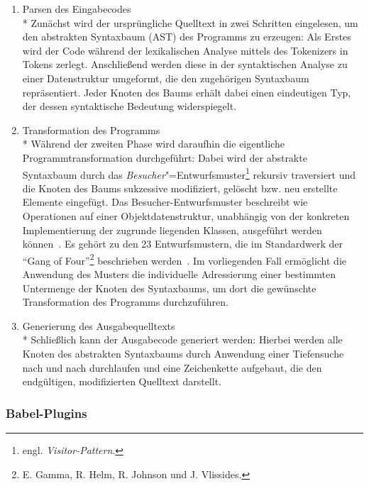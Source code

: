 \begin{enumerate}
  \item {\libertineSB Parsen des Eingabecodes}\\*
    Zunächst wird der ursprüngliche Quelltext in zwei Schritten eingelesen, um den abstrakten Syntaxbaum (AST) des Programms zu erzeugen: Als Erstes wird der Code während der lexikalischen Analyse mittels des Tokenizers in Tokens zerlegt. Anschließend werden diese in der syntaktischen Analyse zu einer Datenstruktur umgeformt, die den zugehörigen Syntaxbaum repräsentiert. Jeder Knoten des Baums erhält dabei einen eindeutigen Typ, der dessen syntaktische Bedeutung widerspiegelt.
    \\

  \item {\libertineSB Transformation des Programms}\\*
    Während der zweiten Phase wird daraufhin die eigentliche Programmtransformation durchgeführt: Dabei wird der abstrakte Syntaxbaum durch das \emph{Besucher}"=Entwurfsmuster\footnote{engl. \textit{Visitor-Pattern}.} rekursiv traversiert und die Knoten des Baums sukzessive modifiziert, gelöscht bzw. neu erstellte Elemente eingefügt. Das Besucher-Entwurfsmuster beschreibt wie Operationen auf einer Objektdatenstruktur, unabhängig von der konkreten Implementierung der zugrunde liegenden Klassen, ausgeführt werden können~\autocite[634\psq]{FREEMAN:2004}. Es gehört zu den 23 Entwurfsmustern, die im Standardwerk  der \enquote{Gang of Four}\footnote{E. Gamma, R. Helm, R. Johnson und J. Vlissides.} beschrieben werden~\autocite[306\psqq]{GAMMA:1994}. Im vorliegenden Fall ermöglicht die Anwendung des Musters die individuelle Adressierung einer bestimmten Untermenge der Knoten des Syntaxbaums, um dort die gewünschte Transformation des Programms durchzuführen.
    \\

  \item {\libertineSB Generierung des Ausgabequelltexts}\\*
    Schließlich kann der Ausgabecode generiert werden: Hierbei werden alle Knoten des abstrakten Syntaxbaums durch Anwendung einer Tiefensuche nach und nach durchlaufen und eine Zeichenkette aufgebaut, die den endgültigen, modifizierten Quelltext darstellt.
\end{enumerate}

\subsubsection{Babel-Plugins}
\label{subsec:babel-plugins}

